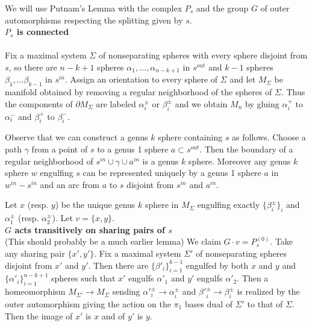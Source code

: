 \documentclass[12pt]{article}
\begin{document}
We will use Putnam's Lemma with the complex $P_s$ and the group $G$ of outer automorphisms respecting the splitting given by $s$.\\



\noindent \textbf{$P_s$ is connected}\\
\\
Fix a maximal system $\Sigma$ of nonseparating spheres with every sphere disjoint from $s$, so there are $n-k+1$ spheres $\alpha_1, \ldots, \alpha_{n-k+1}$ in $s^{out}$ 
and $k-1$ spheres $\beta_1,\ldots \beta_{k-1}$ in $s^{in}$.
Assign an orientation to every sphere of $\Sigma$ and let $M_\Sigma$ be manifold obtained by removing a regular neighborhood of the spheres of $\Sigma$.
Thus the components of $\partial M_\Sigma$ are labeled $\alpha^{\pm}_i$ or $\beta^{\pm}_i$
and we obtain $M_n$ by gluing $\alpha^+_i$ to $\alpha^-_i$ and 
$\beta^+_i$ to $\beta^-_i$.

Observe that we can construct a genus $k$ sphere containing $s$ as follows.
Choose a path $\gamma$ from a point of $s$ to a genus 1 sphere $a \subset s^{out}$. 
Then the boundary of a regular neighborhood of $s^{in} \cup \gamma \cup a^{in}$
is a genus $k$ sphere.
Moreover any genus $k$ sphere $w$ engulfing $s$ can be represented uniquely by a genus 1 sphere $a$  in $w^{in} - s^{in}$ and an arc from $a$ to $s$ disjoint from $s^{in}$ and $a^{in}$.

Let $x$ (resp. $y$) be the unique genus $k$ sphere in $M_\Sigma$ engulfing exactly $\{\beta_i^{\pm}\}_i$ and $\alpha^{\pm}_1$ (resp. $\alpha^{\pm}_2$).
Let $v=\{x,y\}$.\\


\noindent \textbf{$G$ acts transitively on sharing pairs of $s$}\\


(This should probably be a much earlier lemma)
We claim $G \cdot v = P_s^{(0)}$.
Take any sharing pair $\{x',y'\}$.
Fix a maximal system $\Sigma'$ of nonseparating spheres disjoint from $x'$ and $y'$.
Then there are $\{\beta'_i\}_{i=1}^{k-1}$ engulfed by both $x$ and $y$ and $\{\alpha'_i\}_{i=1}^{n-k+1}$ spheres such that $x'$ engulfs $\alpha'_1$ and $y'$ engulfs $\alpha'_2$.
Then a homeomorphism $M_{\Sigma'} \to M_{\Sigma}$ sending ${\alpha'}^\pm_i \to \alpha^\pm_i$
 and ${\beta'}^\pm_i \to \beta^\pm_i$ is realized by the outer automorphism giving the action on the $\pi_1$ bases dual of $\Sigma '$ to that of $\Sigma$.
Then the image of $x'$ is $x$ and of $y'$ is $y$.\\
 
\end{document}
